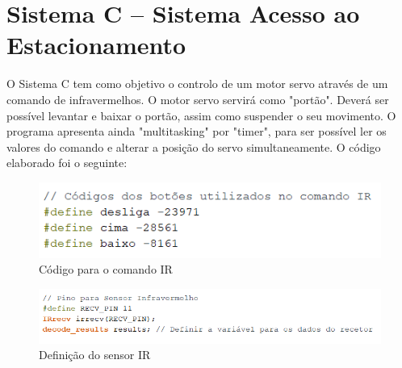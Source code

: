 \section{Sistema C – Sistema Acesso ao Estacionamento}


O Sistema C tem como objetivo o controlo de um motor servo através de um comando de infravermelhos. O motor servo servirá como "portão". Deverá ser possível levantar e baixar o portão, assim como suspender o seu movimento. O programa apresenta ainda "multitasking" por "timer", para ser possível ler os valores do comando e alterar a posição do servo simultaneamente. O código elaborado foi o seguinte:


\begin{figure}[H]
    \centering
    \includegraphics[scale=0.6]{images/codigo/sisC_codigosComando.png}
    \caption{Código para o comando IR}
\end{figure}

\begin{figure}[H]
    \centering
    \includegraphics[scale=0.6]{images/codigo/sisC_definicaoRecetor.png}
    \caption{Definição do sensor IR}
\end{figure}

